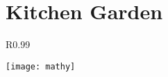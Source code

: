 \documentclass[a4paper,10pt]{book}%
\begin{document}
\chapter[Kitchen Garden]{Kitchen Garden}\begin{wrapfigure}{R}{0.99\textwidth}
         \vspace{-1cm}
        \begin{center}
        \texttt{[image: mathy]}
        \end{center}
         \vspace{-1cm}
    \end{wrapfigure}


































%
%

\end{document}
